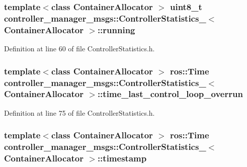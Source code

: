 \subsubsection[{running}]{\setlength{\rightskip}{0pt plus 5cm}template$<$class Container\-Allocator $>$ uint8\-\_\-t {\bf controller\-\_\-manager\-\_\-msgs\-::\-Controller\-Statistics\-\_\-}$<$ \-Container\-Allocator $>$\-::{\bf running}}\label{structcontroller__manager__msgs_1_1ControllerStatistics___a8b2a8baa5afff5da9f83396afe491774}


\-Definition at line 60 of file \-Controller\-Statistics.\-h.

\subsubsection[{time\-\_\-last\-\_\-control\-\_\-loop\-\_\-overrun}]{\setlength{\rightskip}{0pt plus 5cm}template$<$class Container\-Allocator $>$ ros\-::\-Time {\bf controller\-\_\-manager\-\_\-msgs\-::\-Controller\-Statistics\-\_\-}$<$ \-Container\-Allocator $>$\-::{\bf time\-\_\-last\-\_\-control\-\_\-loop\-\_\-overrun}}\label{structcontroller__manager__msgs_1_1ControllerStatistics___a5aaed98b21fe570eaad9bf79eb706333}


\-Definition at line 75 of file \-Controller\-Statistics.\-h.

\subsubsection[{timestamp}]{\setlength{\rightskip}{0pt plus 5cm}template$<$class Container\-Allocator $>$ ros\-::\-Time {\bf controller\-\_\-manager\-\_\-msgs\-::\-Controller\-Statistics\-\_\-}$<$ \-Container\-Allocator $>$\-::{\bf timestamp}}\label{structcontroller__manager__msgs_1_1ControllerStatistics___ae07c0e12ffdd0291a568569cc1ab8374}


